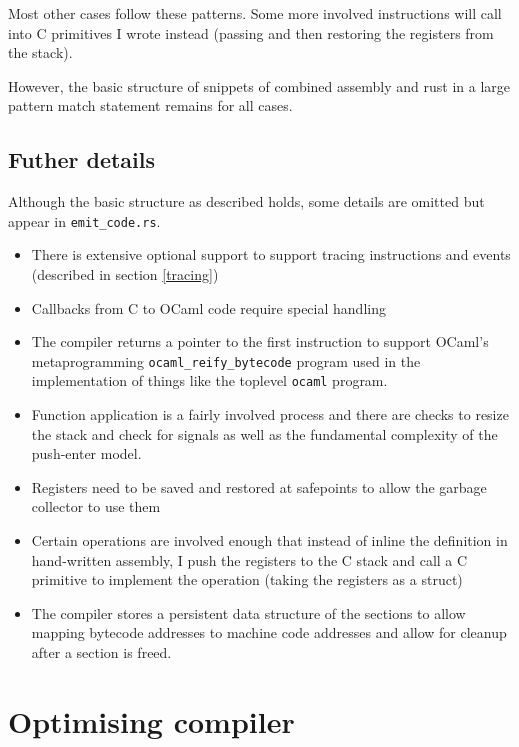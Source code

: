Most other cases follow these patterns. Some more involved instructions will call into C primitives
I wrote instead (passing and then restoring the registers from the stack).

However, the basic structure of snippets of combined assembly and rust in a large pattern match
statement remains for all cases.

\subsection{Futher details}

Although the basic structure as described holds, some details are omitted but appear in
\texttt{emit\_code.rs}.

\begin{itemize}
      \item There is extensive optional support to support tracing instructions and events
            (described
            in section \ref{tracing})
      \item Callbacks from C to OCaml code require special handling
      \item The compiler returns a pointer to the first instruction to support OCaml's
            metaprogramming \texttt{ocaml\_reify\_bytecode} program used in the implementation of
            things like the
            toplevel \texttt{ocaml} program.
      \item Function application is a fairly involved process and there are checks to resize the
            stack and check for signals as well as the fundamental complexity of the push-enter
            model.
      \item Registers need to be saved and restored at safepoints to allow the garbage collector to
            use them
      \item Certain operations are involved enough that instead of inline the definition in
            hand-written assembly, I push the registers to the C stack and call a C primitive to
            implement the
            operation (taking the registers as a struct)
      \item The compiler stores a persistent data structure of the sections to allow mapping
            bytecode addresses to machine code addresses and allow for cleanup after a section is
            freed.
\end{itemize}

\section{Optimising compiler}

